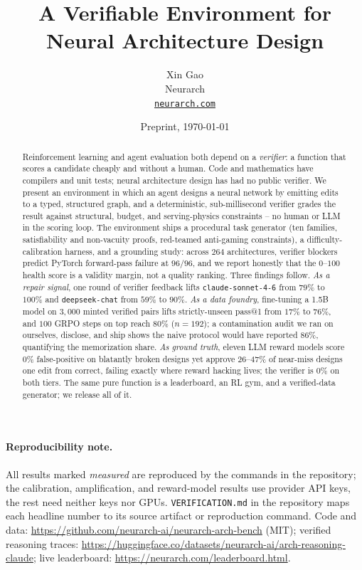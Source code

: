 \documentclass[11pt]{article}
\title{A Verifiable Environment for Neural Architecture Design}
\author{Xin Gao\\ Neurarch\\ \texttt{\href{https://neurarch.com}{neurarch.com}}}
\date{Preprint, \today}
\begin{document}
\maketitle

\begin{abstract}
Reinforcement learning and agent evaluation both depend on a \emph{verifier}: a function that scores a candidate cheaply and without a human. Code and mathematics have compilers and unit tests; neural architecture design has had no public verifier. We present an environment in which an agent designs a neural network by emitting edits to a typed, structured graph, and a deterministic, sub-millisecond verifier grades the result against structural, budget, and serving-physics constraints -- no human or LLM in the scoring loop. The environment ships a procedural task generator (ten families, satisfiability and non-vacuity proofs, red-teamed anti-gaming constraints), a difficulty-calibration harness, and a grounding study: across $264$ architectures, verifier blockers predict PyTorch forward-pass failure at $96/96$, and we report honestly that the $0$--$100$ health score is a validity margin, not a quality ranking. Three findings follow. \emph{As a repair signal}, one round of verifier feedback lifts \texttt{claude-sonnet-4-6} from $79\%$ to $100\%$ and \texttt{deepseek-chat} from $59\%$ to $90\%$. \emph{As a data foundry}, fine-tuning a 1.5B model on $3{,}000$ minted verified pairs lifts strictly-unseen pass@1 from $17\%$ to $76\%$, and $100$ GRPO steps on top reach $80\%$ ($n{=}192$); a contamination audit we ran on ourselves, disclose, and ship shows the naive protocol would have reported $86\%$, quantifying the memorization share. \emph{As ground truth}, eleven LLM reward models score $0\%$ false-positive on blatantly broken designs yet approve $26$--$47\%$ of near-miss designs one edit from correct, failing exactly where reward hacking lives; the verifier is $0\%$ on both tiers. The same pure function is a leaderboard, an RL gym, and a verified-data generator; we release all of it.
\end{abstract}

\paragraph{Reproducibility note.} All results marked \emph{measured} are reproduced by the commands in the repository; the calibration, amplification, and reward-model results use provider API keys, the rest need neither keys nor GPUs. \texttt{VERIFICATION.md} in the repository maps each headline number to its source artifact or reproduction command. Code and data: \url{https://github.com/neurarch-ai/neurarch-arch-bench} (MIT); verified reasoning traces: \url{https://huggingface.co/datasets/neurarch-ai/arch-reasoning-claude}; live leaderboard: \url{https://neurarch.com/leaderboard.html}.
\end{document}
